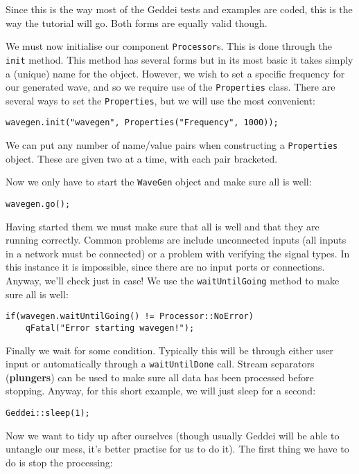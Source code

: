 Since this is the way most of the Geddei tests and examples are coded, this is the way the tutorial will go. Both forms are equally valid though.

We must now initialise our component \texttt{Processor}s. This is done through the \texttt{init} method. This method has several forms but in its most basic it takes simply a (unique) name for the object. However, we wish to set a specific frequency for our generated wave, and so we require use of the \texttt{Properties} class. There are several ways to set the \texttt{Properties}, but we will use the most convenient:

\begin{verbatim}
wavegen.init("wavegen", Properties("Frequency", 1000));
\end{verbatim}

We can put any number of name/value pairs when constructing a \texttt{Properties} object. These are given two at a time, with each pair bracketed.

Now we only have to start the \texttt{WaveGen} object and make sure all is well:

\begin{verbatim}
wavegen.go();
\end{verbatim}

Having started them we must make sure that all is well and that they are running correctly. Common problems are include unconnected inputs (all inputs in a network must be connected) or a problem with verifying the signal types. In this instance it is impossible, since there are no input ports or connections. Anyway, we'll check just in case! We use the \texttt{waitUntilGoing} method to make sure all is well:

\begin{verbatim}
if(wavegen.waitUntilGoing() != Processor::NoError) 
    qFatal("Error starting wavegen!");
\end{verbatim}

Finally we wait for some condition. Typically this will be through either user input or automatically through a \texttt{waitUntilDone} call. Stream separators (\textbf{plungers}) can be used to make sure all data has been processed before stopping. Anyway, for this short example, we will just sleep for a second:

\begin{verbatim}
Geddei::sleep(1);
\end{verbatim}

Now we want to tidy up after ourselves (though usually Geddei will be able to untangle our mess, it's better practise for us to do it). The first thing we have to do is stop the processing:

